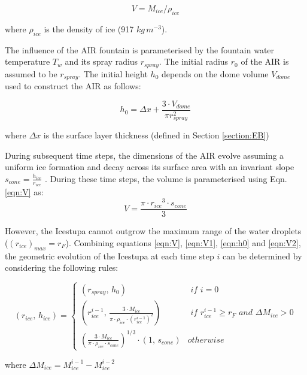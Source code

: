 \documentclass[utf8]{frontiersSCNS} %
\begin{document}
\begin{equation} V = M_{ice} /\rho_{ice} \label{eqn:V1} \end{equation} 

where $\rho_{ice}$ is the density of ice (917 $kg\, m^{-3}$). 


The influence of the AIR fountain is parameterised by the fountain water temperature $T_{w}$ and its spray radius $r_{spray}$.
The initial radius $r_0$ of the AIR is assumed to be $r_{spray}$. The initial height $h_0$ depends on the dome volume
$V_{dome}$ used to construct the AIR as follows:

\begin{equation} 
    h_{0} =  \Delta x + \frac{3 \cdot V_{dome}}{\pi r_{spray}^2 } 
\label{eqn:h0}
  \end{equation}

where $\Delta x$ is the surface layer thickness (defined in Section \ref{section:EB})

During subsequent time steps, the dimensions of the AIR evolve assuming a uniform ice formation and decay across
its surface area with an invariant slope $s_{cone} = \frac{h_{ice}}{r_{ice}}$ .  During
these time steps, the volume is parameterised using Eqn. \ref{eqn:V} as:\begin{equation} V = \frac{\pi \cdot {r_{ice}}^3
    \cdot s_{cone}}{3} \label{eqn:V2} \end{equation} 


However, the Icestupa cannot outgrow the maximum range of the water droplets ($(r_{ice})_{max} = r_{F}$). Combining
equations \ref{eqn:V},  \ref{eqn:V1}, \ref{eqn:h0} and \ref{eqn:V2}, the geometric evolution of the Icestupa at each time step $i$ can
be determined by considering the following rules:

\begin{equation} (r_{ice},\, h_{ice}) = \left\{ \begin{array}{ll} (r_{spray} ,\, h_0) & \textit{ if } i=0\\
    (r_{ice}^{i-1},\, \frac{3 \cdot M_{ice}}{\pi \cdot \rho_{ice} \cdot {(r_{ice}^{i-1})}^2}) & \textit{ if }
    r_{ice}^{i-1} \geq r_{F} \textit{ and } \Delta M_{ice} > 0 \\ (\frac{3 \cdot M_{ice}}{\pi \cdot \rho_{ice} \cdot s_{cone}})^{1/3} \cdot (1,\,  s_{cone}) &
otherwise \end{array} \right.  \label{eqn:A2} \end{equation}

where $\Delta M_{ice} = M_{ice}^{i-1} - M_{ice}^{i-2}$
\end{document}
